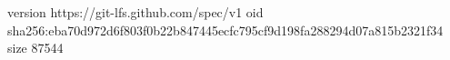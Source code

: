 version https://git-lfs.github.com/spec/v1
oid sha256:eba70d972d6f803f0b22b847445ecfc795cf9d198fa288294d07a815b2321f34
size 87544
